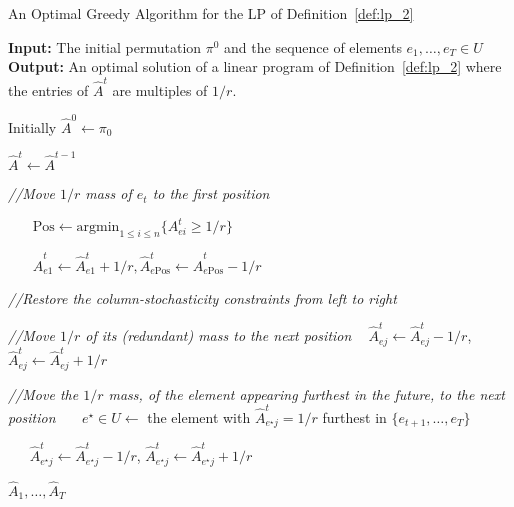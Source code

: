 \begin{algorithm}[t]
  \caption{An Optimal Greedy Algorithm for the LP of Definition~\ref{def:lp_2} 
  }\label{alg:greedy_moving}
  \textbf{Input:} The initial permutation $\pi^0$ and the sequence of elements $e_1,\ldots,e_T \in U$\\
  \textbf{Output:} An optimal solution of a linear program of Definition~\ref{def:lp_2} where the  entries of $\hat{A}^t$ are multiples of $1/r$.

 \begin{algorithmic}[1]
        \STATE Initially $\hat{A}^0 \leftarrow \pi_0$
    
        
        \STATE $ \hat{A}^t \leftarrow \hat{A}^{t-1}$
  
            \STATE \emph{//Move $1/r$ mass of $e_t$ to the first position}
            
            \STATE $~~~~~~~~\mathrm{Pos} \leftarrow \text{argmin}_{1 \leq i \leq n} \{A^t_{ei}\geq 1/r\}$
        
            \STATE $~~~~~~~~\hat{A}^t_{e1} \leftarrow \hat{A}^t_{e1} + 1/r, \hat{A}^t_{e\mathrm{Pos}} \leftarrow \hat{A}^t_{e\mathrm{Pos}} - 1/r$
            
            \STATE \emph{//Restore the column-stochasticity constraints from left to right}
        
    
    
                \STATE \emph{//Move $1/r$ of its (redundant) mass to the next position}
                \STATE $~~~~\hat{A}_{ej}^t \leftarrow \hat{A}_{ej}^t - 1/r$, $\hat{A}_{ej}^t \leftarrow \hat{A}_{ej}^t + 1/r$   
    
            \ELSE
            
            \STATE \emph{//Move the $1/r$ mass, of the element appearing furthest in the future, to the next position}
            \STATE $~~~~~~~e^\star \in U \leftarrow$  the element with $\hat{A}_{e^\star j}^t = 1/r$ furthest in $\{e_{t+1},\ldots,e_T\}$
            
            \STATE $~~~~~~~\hat{A}_{e^\star j}^t \leftarrow \hat{A}_{e^\star j}^t - 1/r$, $\hat{A}_{e^\star j}^t \leftarrow \hat{A}_{e^\star j}^t + 1/r$
            \ENDIF    
            \ENDFOR            
            
        \ENDIF 
    
        \ENDFOR
        
        \RETURN $\hat{A}_1,\ldots,\hat{A}_T$
  \end{algorithmic}
\end{algorithm}



